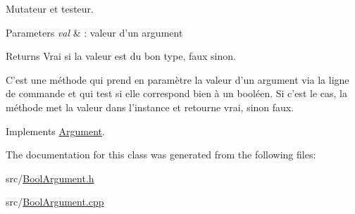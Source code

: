 Mutateur et testeur. 


\begin{DoxyParams}{Parameters}
{\em val} & \-: valeur d'un argument \\
\hline
\end{DoxyParams}
\begin{DoxyReturn}{Returns}
Vrai si la valeur est du bon type, faux sinon.
\end{DoxyReturn}
C'est une méthode qui prend en paramètre la valeur d'un argument via la ligne de commande et qui test si elle correspond bien à un booléen. Si c'est le cas, la méthode met la valeur dans l'instance et retourne vrai, sinon faux. 

Implements \hyperlink{classArgument_a20b6a0182f1402dd36b20b1a6743e665}{Argument}.



The documentation for this class was generated from the following files\-:\begin{DoxyCompactItemize}
\item 
src/\hyperlink{BoolArgument_8h}{Bool\-Argument.\-h}\item 
src/\hyperlink{BoolArgument_8cpp}{Bool\-Argument.\-cpp}\end{DoxyCompactItemize}
